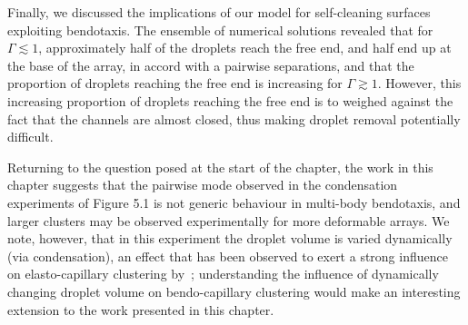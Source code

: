 Finally, we discussed the implications of our model for self-cleaning surfaces exploiting bendotaxis. The ensemble of numerical solutions revealed that for $\Gamma \lesssim 1$, approximately half of the droplets reach the free end, and half end up at the base of the array, in accord with a pairwise separations, and that the proportion of droplets reaching the free end is increasing for $\Gamma \gtrsim 1$. However, this increasing proportion of droplets reaching the free end is to weighed against the fact that the channels are almost closed, thus making droplet removal potentially difficult.

Returning to the question posed at the start of the chapter, the work in this chapter suggests that the pairwise mode observed in the condensation experiments of Figure 5.1 is not generic behaviour in multi-body bendotaxis, and larger clusters may be observed experimentally for more deformable arrays. We note, however, that in this experiment the droplet volume is varied dynamically (via condensation), an effect that has been observed to exert a strong influence on elasto-capillary clustering by~\cite{Hadjittofis2016JFM}; understanding the influence of dynamically changing droplet volume on bendo-capillary clustering would make an interesting extension to the work presented in this chapter.

